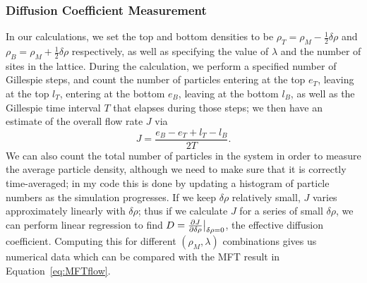 \subsubsection{Diffusion Coefficient Measurement}
In our calculations, we set the top and bottom densities to be $\rho_T = \rho_M - \frac{1}{2} \delta\rho$ and $\rho_B = \rho_M + \frac{1}{2} \delta\rho$ respectively, as well as specifying the value of $\lambda$ and the number of sites
in the lattice. During the calculation, we perform a specified number
of Gillespie steps, and count the number of particles entering at the top $e_T$, leaving at the top $l_T$, entering at the bottom $e_B$, leaving at the bottom $l_B$, as well as the Gillespie time interval $T$ that elapses during
those steps; we then have an estimate of the overall flow rate $J$ via
\begin{equation}
 J = \frac{e_B-e_T+l_T-l_B}{2T}.
\end{equation}
We can also count the total number of particles in the system in order to measure the average particle density, although we need to make sure that it is correctly time-averaged; in my code this is done by updating a histogram of particle numbers
as the simulation progresses.
If we keep $\delta\rho$ relatively small, $J$ varies approximately linearly with $\delta\rho$; thus if we calculate $J$ for a series of small $\delta \rho$, we can perform linear regression to find $D=\frac{\partial J}{\partial \delta\rho}\big|_{\delta\rho=0}$,
the effective diffusion coefficient. Computing this for different $(\rho_M, \lambda)$ combinations gives us numerical data which can be compared with the MFT result in Equation~\ref{eq:MFTflow}.
